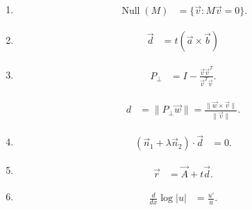 \begin{enumerate}[label=\thesubsection.\arabic*, ref=\thesubsection.\theenumi, leftmargin=12mm, itemsep=4pt]

    \setcounter{enumi}{0}
    \item[\ref{question-short:C12-Q01}]
    \begin{align}
        \operatorname{Null}(M) &= \{\vec v:M\vec v=0\}.
        \label{formula:C12-Q01}
    \end{align}

    \setcounter{enumi}{1}
    \item[\ref{question-short:C12-Q05}]
    \begin{align}
        \vec d &= t(\vec a\times\vec b)
        \label{formula:C12-Q05}
    \end{align}

    \setcounter{enumi}{2}
    \item[\ref{question-short:C12-Q06}]
    \begin{align}
        P_\perp &= I-\frac{\vec v\vec v^T}{\vec v^T\vec v}.
        \label{formula:C12-Q06}
    \end{align}

    \begin{align}
        d &= \|P_\perp\vec w\|
        = \frac{\|\vec w\times\vec v\|}{\|\vec v\|}.
        \label{formula:C12-Q06-S01}
    \end{align}

    \setcounter{enumi}{3}
    \item[\ref{question-short:C12-Q10}]
    \begin{align}
        (\vec n_1+\lambda\vec n_2)\cdot\vec d &= 0.
        \label{formula:C12-Q10}
    \end{align}

    \setcounter{enumi}{4}
    \item[\ref{question-short:C12-Q15}]
    \begin{align}
        \vec r &= \vec A+t\vec d.
        \label{formula:C12-Q15}
    \end{align}

    \setcounter{enumi}{5}
    \item[\ref{question-short:C12-Q25}]
    \begin{align}
        \frac{d}{dx}\log|u| &= \frac{u'}u.
        \label{formula:C12-Q25}
    \end{align}


\end{enumerate}
